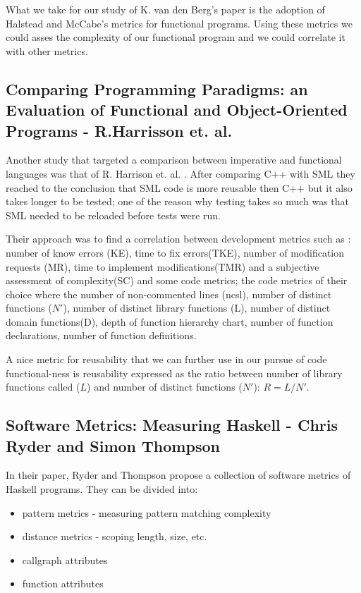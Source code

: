 \documentclass{article}
\begin{document}
What we take for our study of  K. van den Berg's paper is the adoption of Halstead and McCabe's metrics for functional programs. Using these metrics we could asses the complexity of our functional program and we could correlate it with other metrics. 

\subsection{Comparing Programming Paradigms: an Evaluation of Functional and Object-Oriented Programs - R.Harrisson et. al.}
Another study that targeted a comparison between imperative and functional languages was that of R. Harrison et. al. \cite{eps250597} . After comparing C++ with SML they reached to the conclusion that SML code is more reusable then C++ but it also takes longer to be tested; one of the reason why testing takes so much was that SML needed to be reloaded before tests were run. \par

Their approach was to find a correlation between development metrics such as : number of know errors (KE), time to fix errors(TKE), number of modification requests (MR), time to implement modifications(TMR) and a subjective assessment of complexity(SC) and some code metrics; the code metrics of their choice where the number of non-commented lines (ncsl), number of distinct functions ($N'$), number of distinct library functions (L), number of distinct domain functions(D), depth of function hierarchy chart, number of function declarations, number of function definitions. \par

A nice metric for reusability that we can further use in our pursue of code functional-ness is reusability expressed as the ratio between number of library functions called ($L$) and number of distinct functions ($N'$): $R = L / N'$. \par

\subsection{Software Metrics: Measuring Haskell - Chris Ryder and Simon Thompson}
In their paper, Ryder and Thompson propose a collection of software metrics of Haskell programs. They can be divided into:
\begin{itemize}
\item pattern metrics - measuring pattern matching complexity
\item distance metrics - scoping length, size, etc.
\item callgraph attributes 
\item function attributes
\end{itemize}
\end{document}
